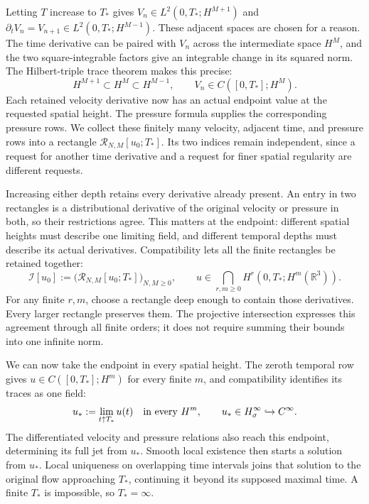 Letting \(T\) increase to \(T_*\) gives
\(V_n\in L^2(0,T_*;H^{M+1})\) and
\(\partial_tV_n=V_{n+1}\in L^2(0,T_*;H^{M-1})\).
These adjacent spaces are chosen for a reason. The time derivative can be
paired with \(V_n\) across the intermediate space \(H^M\), and the two
square-integrable factors give an integrable change in its squared norm.
The Hilbert-triple trace theorem makes this precise:
\[
 H^{M+1}\subset H^M\subset H^{M-1},
 \qquad V_n\in C([0,T_*];H^M).
\]
Each retained velocity derivative now has an actual endpoint value at the
requested spatial height. The pressure formula supplies the corresponding
pressure rows. We collect these finitely many velocity, adjacent time,
and pressure rows into a rectangle \(\mathcal R_{N,M}[u_0;T_*]\).
Its two indices remain independent, since a request for another time
derivative and a request for finer spatial regularity are different requests.

Increasing either depth retains every derivative already present. An entry
in two rectangles is a distributional derivative of the original velocity
or pressure in both, so their restrictions agree. This matters at the
endpoint: different spatial heights must describe one limiting field,
and different temporal depths must describe its actual derivatives.
Compatibility lets all the finite rectangles be retained together:
\[
 \mathcal I[u_0]
 :=\bigl(\mathcal R_{N,M}[u_0;T_*]\bigr)_{N,M\ge0},
 \qquad
 u\in\bigcap_{r,m\ge0}H^r(0,T_*;H^m(\mathbb R^3)).
\]
For any finite \(r,m\), choose a rectangle deep enough to contain those
derivatives. Every larger rectangle preserves them. The projective
intersection expresses this agreement through all finite orders; it does
not require summing their bounds into one infinite norm.

We can now take the endpoint in every spatial height. The zeroth temporal
row gives \(u\in C([0,T_*];H^m)\) for every finite \(m\), and compatibility
identifies its traces as one field:
\[
 u_*:=\lim_{t\uparrow T_*}u(t)
 \quad\hbox{in every }H^m,
 \qquad u_*\in H^\infty_\sigma\hookrightarrow C^\infty.
\]
The differentiated velocity and pressure relations also reach this endpoint,
determining its full jet from \(u_*\). Smooth local existence then starts a
solution from \(u_*\). Local uniqueness on overlapping time intervals joins
that solution to the original flow approaching \(T_*\), continuing it beyond
its supposed maximal time. A finite \(T_*\) is impossible, so \(T_*=\infty\).

